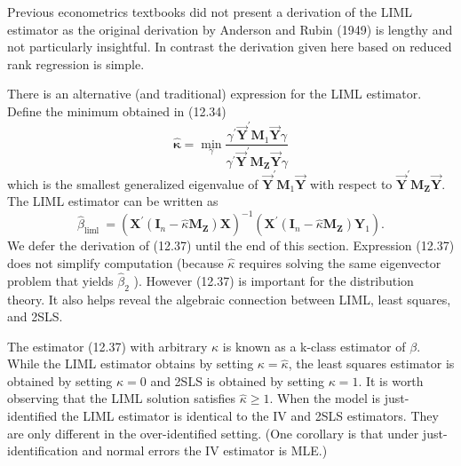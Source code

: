 \documentclass[10pt]{article}
\begin{document}
Previous econometrics textbooks did not present a derivation of the LIML estimator as the original derivation by Anderson and Rubin (1949) is lengthy and not particularly insightful. In contrast the derivation given here based on reduced rank regression is simple.

There is an alternative (and traditional) expression for the LIML estimator. Define the minimum obtained in (12.34)
$$
\widehat{\boldsymbol{\kappa}}=\min _{\gamma} \frac{\gamma^{\prime} \overrightarrow{\boldsymbol{Y}}^{\prime} \boldsymbol{M}_{1} \overrightarrow{\boldsymbol{Y}} \gamma}{\gamma^{\prime} \overrightarrow{\boldsymbol{Y}}^{\prime} \boldsymbol{M}_{\boldsymbol{Z}} \overrightarrow{\boldsymbol{Y}} \gamma}
$$
which is the smallest generalized eigenvalue of $\overrightarrow{\boldsymbol{Y}}^{\prime} \boldsymbol{M}_{1} \overrightarrow{\boldsymbol{Y}}$ with respect to $\overrightarrow{\boldsymbol{Y}}^{\prime} \boldsymbol{M}_{\boldsymbol{Z}} \overrightarrow{\boldsymbol{Y}}$. The LIML estimator can be written as
$$
\widehat{\beta}_{\text {liml }}=\left(\boldsymbol{X}^{\prime}\left(\boldsymbol{I}_{n}-\widehat{\kappa} \boldsymbol{M}_{\boldsymbol{Z}}\right) \boldsymbol{X}\right)^{-1}\left(\boldsymbol{X}^{\prime}\left(\boldsymbol{I}_{n}-\widehat{\kappa} \boldsymbol{M}_{\boldsymbol{Z}}\right) \boldsymbol{Y}_{1}\right) .
$$
We defer the derivation of (12.37) until the end of this section. Expression (12.37) does not simplify computation (because $\widehat{\kappa}$ requires solving the same eigenvector problem that yields $\widehat{\beta}_{2}$ ). However (12.37) is important for the distribution theory. It also helps reveal the algebraic connection between LIML, least squares, and 2SLS.

The estimator (12.37) with arbitrary $\kappa$ is known as a k-class estimator of $\beta$. While the LIML estimator obtains by setting $\kappa=\widehat{\kappa}$, the least squares estimator is obtained by setting $\kappa=0$ and 2SLS is obtained by setting $\kappa=1$. It is worth observing that the LIML solution satisfies $\widehat{\kappa} \geq 1$. When the model is just-identified the LIML estimator is identical to the IV and 2SLS estimators. They are only different in the over-identified setting. (One corollary is that under just-identification and normal errors the IV estimator is MLE.)
\end{document}
